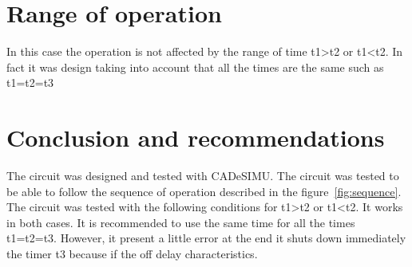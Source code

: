\documentclass[runningheads]{llncs}
\begin{document}
\section{Range of operation}

In this case the operation is not affected by the range of time t1>t2 or t1<t2. In fact it was design taking into account that all the times are the same such as  t1=t2=t3 


\section{Conclusion and recommendations}

The circuit was designed and tested with CADeSIMU. The circuit was tested to be able to follow the sequence of operation described in the figure~\ref{fig:sequence}. 
The circuit was tested with the following conditions for t1>t2 or t1<t2. It works in both cases. It is recommended to use the same time for all the times t1=t2=t3. However,
it present a little error at the end it shuts down immediately the timer t3 because if the off delay characteristics.


% 
% 
\end{document}
